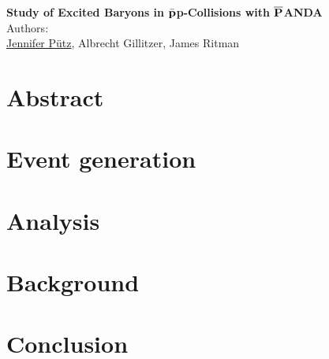 \documentclass[a4paper, 11pt, twoside]{scrreprt}
\begin{document}
	\pagestyle{fancy}
	\begin{titlepage}
		\thispagestyle{empty}
		\begin{center}
			\textbf{\Huge{Study of Excited \cascade Baryons in $\bar{\textnormal{\textbf{p}}}$p-Collisions with $\overline{\textnormal{\textbf{P}}}$ANDA}}\vspace{1cm}\\
			\Large{Authors:}\vspace{0.3cm}\\
			\LARGE{\underline{Jennifer 
			      P\"{u}tz}, Albrecht Gillitzer, James Ritman\vspace{2cm}}
		\end{center}\vspace{1cm}

	\end{titlepage}
	\thispagestyle{empty}
	\chapter*{Abstract}
		
		\thispagestyle{empty}
	
	
	\setcounter{page}{0}
	\tableofcontents
	\newpage
	\setcounter{page}{1}
	
	\linenumbers
	
	\chapter{Event generation}
		
	
	\chapter{Analysis}
		
	
	\chapter{Background}
		
	
	\chapter{Conclusion}
		
\end{document}
